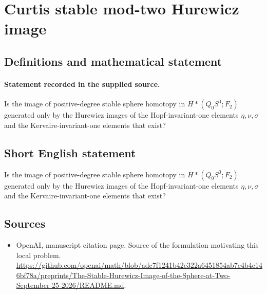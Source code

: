 \documentclass[11pt]{article}
\begin{document}
\section*{Curtis stable mod-two Hurewicz image}\label{30007501}
\subsection{Definitions and mathematical statement}
\paragraph{Statement recorded in the supplied source.}
Is the image of positive-degree stable sphere homotopy in $H*(Q_{0}S^{0};F_{2})$ generated only by the Hurewicz images of the Hopf-invariant-one elements $\eta ,\nu ,\sigma $ and the Kervaire-invariant-one elements that exist?
\subsection{Short English statement}
Is the image of positive-degree stable sphere homotopy in $H*(Q_{0}S^{0};F_{2})$ generated only by the Hurewicz images of the Hopf-invariant-one elements $\eta ,\nu ,\sigma $ and the Kervaire-invariant-one elements that exist?
\subsection{Sources}
\begin{itemize}
\item[S1] OpenAI, manuscript citation page. Source of the formulation motivating this local problem.
\url{https://github.com/openai/math/blob/adc7f1241b42e322a6451854ab7e4b4c146bf78a/preprints/The-Stable-Hurewicz-Image-of-the-Sphere-at-Two-September-25-2026/README.md}.
\end{itemize}
\end{document}
